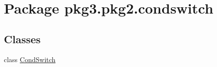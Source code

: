 \hypertarget{namespacepkg3_1_1pkg2_1_1condswitch}{}\section{Package pkg3.\+pkg2.\+condswitch}
\label{namespacepkg3_1_1pkg2_1_1condswitch}
\subsection*{Classes}
\begin{DoxyCompactItemize}
\item 
class \mbox{\hyperlink{classpkg3_1_1pkg2_1_1condswitch_1_1_cond_switch}{Cond\+Switch}}
\end{DoxyCompactItemize}
